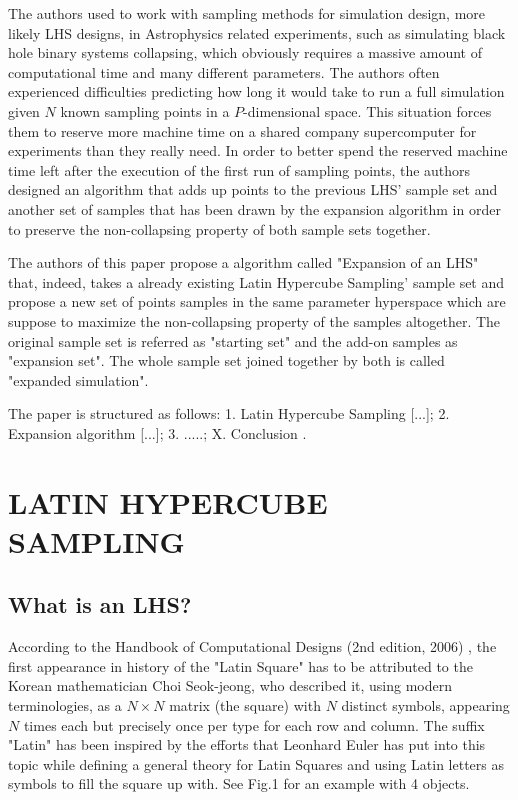 \documentclass[12pt]{article}
\begin{document}
The authors used to work with sampling methods for simulation design, more likely LHS designs, in Astrophysics related experiments, such as simulating black hole binary systems collapsing, which obviously requires a massive amount of computational time and many different parameters. The authors often experienced difficulties predicting how long it would take to run a full simulation given $N$ known sampling points in a $P$-dimensional space. This situation forces them to reserve more machine time on a shared company supercomputer for experiments than they really need. In order to better spend the reserved machine time left after the execution of the first run of sampling points, the authors designed an algorithm that adds up points to the previous LHS' sample set and another set of samples that has been drawn by the expansion algorithm in order to preserve the non-collapsing property of both sample sets together.

The authors of this paper propose a algorithm called "Expansion of an LHS" that, indeed, takes a already existing Latin Hypercube Sampling' sample set and propose a new set of points samples in the same parameter hyperspace which are suppose to maximize the non-collapsing property of the samples altogether. 
The original sample set is referred as "starting set" and the add-on samples as "expansion set". The whole sample set joined together by both is called "expanded simulation".

The paper is structured as follows: 1. Latin Hypercube Sampling [...]; 2. Expansion algorithm [...]; 3. .....; X. Conclusion .

\section{LATIN HYPERCUBE SAMPLING}
\subsection{What is an LHS? }
According to the Handbook of Computational Designs (2nd edition, 2006) , the first appearance in history of the "Latin Square" has to be attributed to the Korean mathematician Choi Seok-jeong, who described it, using modern terminologies, as a $N \times N$ matrix (the square) with $N$ distinct symbols, appearing $N$ times each but precisely once per type for each row and column. The suffix "Latin" has been inspired by the efforts that Leonhard Euler has put into this topic while defining a general theory for Latin Squares  and using Latin letters as symbols to fill the square up with. See Fig.1 for an example with 4 objects.
\end{document}
